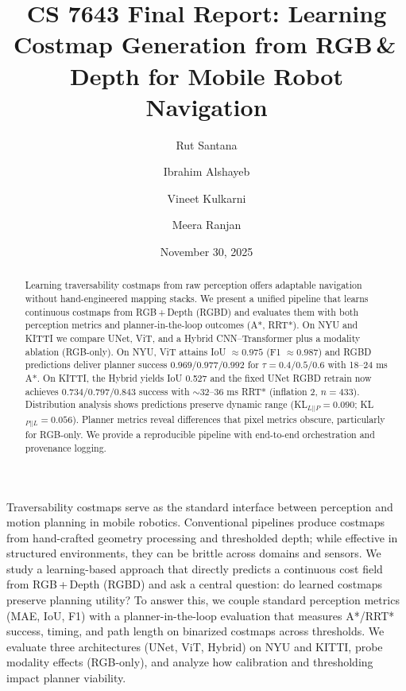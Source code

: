 \documentclass{article}
\title{CS 7643 Final Report: Learning Costmap Generation from RGB\,\&\,Depth for Mobile Robot Navigation}
\author{Rut Santana \and Ibrahim Alshayeb \and Vineet Kulkarni \and Meera Ranjan}
\date{November 30, 2025}
\makeatletter
\renewcommand\section{\@startsection{section}{1}{\z@}{2.0ex plus 0.4ex minus 0.5ex}{0.7ex plus 0.2ex}{\normalfont\Large\bfseries}}
\makeatother
\begin{document}
\maketitle

\begin{abstract}
Learning traversability costmaps from raw perception offers adaptable navigation without hand-engineered mapping stacks. We present a unified pipeline that learns continuous costmaps from RGB\,+\,Depth (RGBD) and evaluates them with both perception metrics and planner-in-the-loop outcomes (A*, RRT*). On NYU and KITTI we compare UNet, ViT, and a Hybrid CNN--Transformer plus a modality ablation (RGB-only). On NYU, ViT attains IoU $\approx 0.975$ (F1 $\approx 0.987$) and RGBD predictions deliver planner success $0.969/0.977/0.992$ for $\tau=0.4/0.5/0.6$ with 18--24 ms A*. On KITTI, the Hybrid yields IoU 0.527 and the fixed UNet RGBD retrain now achieves $0.734/0.797/0.843$ success with $\sim$32--36 ms RRT* (inflation 2, $n=433$). Distribution analysis shows predictions preserve dynamic range (KL$_{L||P}{=}0.090$; KL$_{P||L}{=}0.056$). Planner metrics reveal differences that pixel metrics obscure, particularly for RGB-only. We provide a reproducible pipeline with end-to-end orchestration and provenance logging.
\end{abstract}

\section{Introduction}
Traversability costmaps serve as the standard interface between perception and motion planning in mobile robotics. Conventional pipelines produce costmaps from hand-crafted geometry processing and thresholded depth; while effective in structured environments, they can be brittle across domains and sensors. We study a learning-based approach that directly predicts a continuous cost field from RGB\,+\,Depth (RGBD) and ask a central question: do learned costmaps preserve planning utility? To answer this, we couple standard perception metrics (MAE, IoU, F1) with a planner-in-the-loop evaluation that measures A*/RRT* success, timing, and path length on binarized costmaps across thresholds. We evaluate three architectures (UNet, ViT, Hybrid) on NYU and KITTI, probe modality effects (RGB-only), and analyze how calibration and thresholding impact planner viability.
\end{document}
